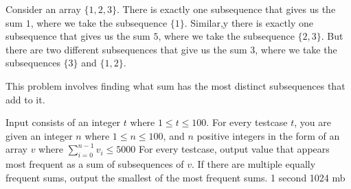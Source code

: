 {Consider an array $\{1,2,3\}$. There is exactly one subsequence that gives us the sum $1$, where we take the subsequence $\{1\}$. Similar,y there is exactly one subsequence that gives us the sum $5$, where we take the subsequence $\{2,3\}$. But there are two different subsequences that give us the sum $3$, where we take the subsequences $\{3\}$ and $\{1,2\}$.

This problem involves finding what sum has the most distinct subsequences that add to it.}
{Input consists of an integer $t$ where $1 \le t \le 100$. For every testcase $t$, you are given an integer $n$ where $1 \le n \le 100$, and $n$ positive integers in the form of an array $v$ where $\sum_{i=0}^{n-1} v_i \le 5000$}
{For every testcase, output value that appears most frequent as a sum of subsequences of $v$. If there are multiple equally frequent sums, output the smallest of the most frequent sums.}
{1 second}
{1024 mb}
{}